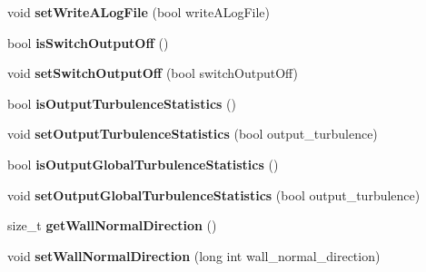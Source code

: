 \begin{DoxyCompactItemize}
\item 
\hypertarget{classnatrium_1_1SolverConfiguration_a6e50f8fc372b4346ba9f309d5d5f47b3}{
void {\bfseries setWriteALogFile} (bool writeALogFile)}
\label{classnatrium_1_1SolverConfiguration_a6e50f8fc372b4346ba9f309d5d5f47b3}

\item 
\hypertarget{classnatrium_1_1SolverConfiguration_ae4852378b026ccc913732eb8b20eca74}{
bool {\bfseries isSwitchOutputOff} ()}
\label{classnatrium_1_1SolverConfiguration_ae4852378b026ccc913732eb8b20eca74}

\item 
\hypertarget{classnatrium_1_1SolverConfiguration_afcae7f43456c2a127c242b230ea3a8a2}{
void {\bfseries setSwitchOutputOff} (bool switchOutputOff)}
\label{classnatrium_1_1SolverConfiguration_afcae7f43456c2a127c242b230ea3a8a2}

\item 
\hypertarget{classnatrium_1_1SolverConfiguration_a4de0ef11cf54bbadd744c67db090c09d}{
bool {\bfseries isOutputTurbulenceStatistics} ()}
\label{classnatrium_1_1SolverConfiguration_a4de0ef11cf54bbadd744c67db090c09d}

\item 
\hypertarget{classnatrium_1_1SolverConfiguration_a9e16b95c4fcd4c30518d1ce6389c093d}{
void {\bfseries setOutputTurbulenceStatistics} (bool output\_\-turbulence)}
\label{classnatrium_1_1SolverConfiguration_a9e16b95c4fcd4c30518d1ce6389c093d}

\item 
\hypertarget{classnatrium_1_1SolverConfiguration_aff40727b3bc6a89d8096fe07f286371e}{
bool {\bfseries isOutputGlobalTurbulenceStatistics} ()}
\label{classnatrium_1_1SolverConfiguration_aff40727b3bc6a89d8096fe07f286371e}

\item 
\hypertarget{classnatrium_1_1SolverConfiguration_a244a09971cb400d5d7dc64a0b26344ba}{
void {\bfseries setOutputGlobalTurbulenceStatistics} (bool output\_\-turbulence)}
\label{classnatrium_1_1SolverConfiguration_a244a09971cb400d5d7dc64a0b26344ba}

\item 
\hypertarget{classnatrium_1_1SolverConfiguration_ae385a0869299d9cef472cce5170bdd30}{
size\_\-t {\bfseries getWallNormalDirection} ()}
\label{classnatrium_1_1SolverConfiguration_ae385a0869299d9cef472cce5170bdd30}

\item 
\hypertarget{classnatrium_1_1SolverConfiguration_afb4a6d67f7ad8ca10c52cecc87662909}{
void {\bfseries setWallNormalDirection} (long int wall\_\-normal\_\-direction)}
\label{classnatrium_1_1SolverConfiguration_afb4a6d67f7ad8ca10c52cecc87662909}


\end{DoxyCompactItemize}
